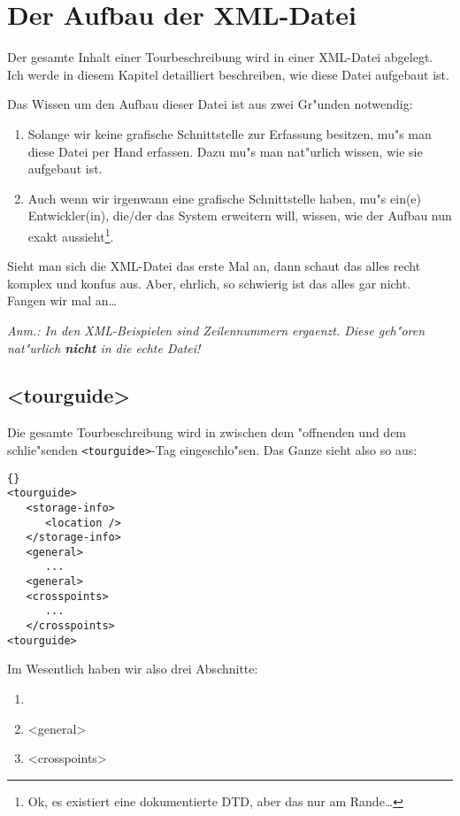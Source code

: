 \section{Der Aufbau der  XML-Datei}\label{sec:xml-structure} 

Der gesamte Inhalt einer Tourbeschreibung wird in einer XML-Datei abgelegt.
Ich werde in diesem Kapitel detailliert beschreiben, wie diese Datei aufgebaut
ist.

Das Wissen um den Aufbau dieser Datei ist aus zwei Gr"unden notwendig:
\begin{enumerate}
\item Solange wir keine grafische Schnittstelle zur Erfassung besitzen, mu"s
      man diese Datei per Hand erfassen. Dazu mu"s man nat"urlich wissen, wie
      sie aufgebaut ist.
\item Auch wenn wir irgenwann eine grafische Schnittstelle haben, mu"s ein(e)
      Entwickler(in), die/der das System erweitern will, wissen, wie der Aufbau
      nun exakt aussieht\footnote{Ok, es existiert eine dokumentierte DTD, aber 
      das nur am Rande\ldots}.
\end{enumerate}

Sieht man sich die XML-Datei das erste Mal an, dann schaut das alles recht 
komplex und konfus aus. Aber, ehrlich, so schwierig ist das alles gar nicht.
Fangen wir mal an\ldots

\textit{Anm.: In den XML-Beispielen sind Zeilennummern ergaenzt. Diese geh"oren 
nat"urlich \textbf{nicht} in die echte Datei!
}

\subsection{<tourguide>}

Die gesamte Tourbeschreibung wird in zwischen dem "offnenden und dem
schlie"senden \texttt{<tourguide>}-Tag eingeschlo"sen. Das Ganze sieht also
so aus:

\lstset{numbers=left,numberstyle=\tiny,stepnumber=1}
\begin{lstlisting}{}
<tourguide>
   <storage-info>
      <location />
   </storage-info>
   <general>
      ...
   <general>
   <crosspoints>
      ...
   </crosspoints>
<tourguide>
\end{lstlisting}

Im Wesentlich haben wir also drei Abschnitte:
\begin{enumerate}
\item <storage-info>
\item <general>
\item <crosspoints>
\end{enumerate}

